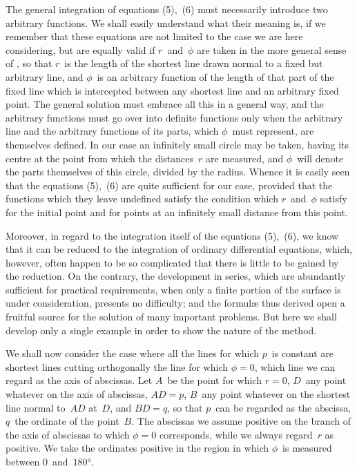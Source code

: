 The general integration of equations (5),~(6) must necessarily introduce two arbitrary
functions. We shall easily understand what their meaning is, if we remember
that these equations are not limited to the case we are here considering, but are
equally valid if $r$~and~$\phi$ are taken in the more general sense of , so that $r$~is
the length of the shortest line drawn normal to a fixed but arbitrary line, and $\phi$~is
an arbitrary function of the length of that part of the fixed line which is intercepted
between any shortest line and an arbitrary fixed point. The general solution must
embrace all this in a general way, and the arbitrary functions must go over into
definite functions only when the arbitrary line and the arbitrary functions of its
parts, which $\phi$~must represent, are themselves defined. In our case an infinitely
small circle may be taken, having its centre at the point from which the distances~$r$
are measured, and $\phi$~will denote the parts themselves of this circle, divided by the
radius. Whence it is easily seen that the equations (5),~(6) are quite sufficient for
our case, provided that the functions which they leave undefined satisfy the condition
which $r$~and~$\phi$ satisfy for the initial point and for points at an infinitely small
distance from this point.

Moreover, in regard to the integration itself of the equations (5),~(6), we know
that it can be reduced to the integration of ordinary differential equations, which, however,
often happen to be so complicated that there is little to be gained by the reduction.
On the contrary, the development in series, which are abundantly sufficient for
practical requirements, when only a finite portion of the surface is under consideration,
presents no difficulty; and the formulæ thus derived open a fruitful source for
the solution of many important problems. But here we shall develop only a single
example in order to show the nature of the method.



We shall now consider the case where all the lines for which $p$~is constant are
shortest lines cutting orthogonally the line for which $\phi = 0$, which line we can regard
as the axis of abscissas. Let $A$~be the point for which $r = 0$, $D$~any point whatever
on the axis of abscissas, $AD = p$, $B$~any point whatever on the shortest line normal
to~$AD$ at~$D$, and $BD = q$, so that $p$~can be regarded as the abscissa, $q$~the ordinate
of the point~$B$. The abscissas we assume positive on the branch of the axis of
abscissas to which $\phi = 0$ corresponds, while we always regard~$r$ as positive. We take
the ordinates positive in the region in which $\phi$~is measured between $0$~and~$180°$.

